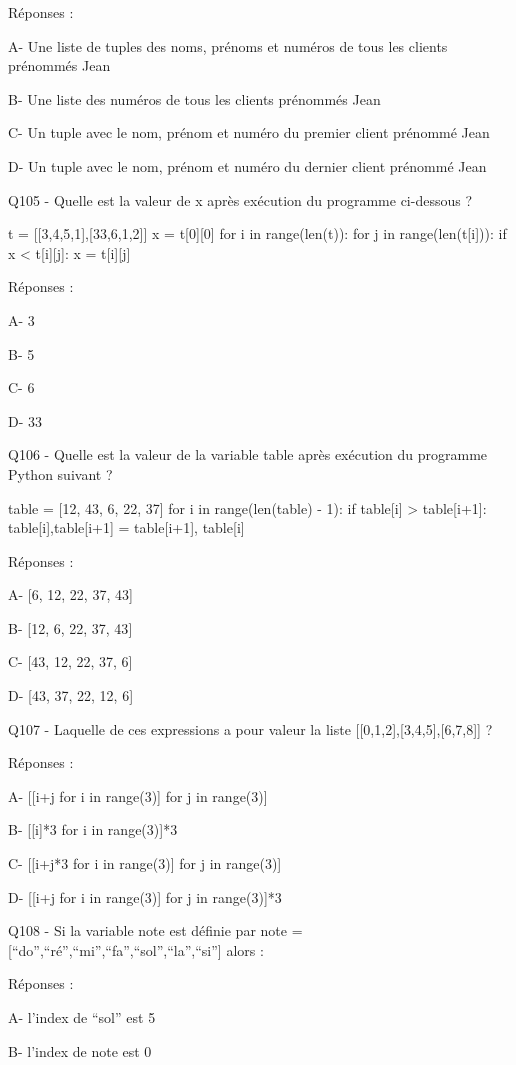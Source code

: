 \documentclass[
]{book}
\begin{document}
Réponses :

A- Une liste de tuples des noms, prénoms et numéros de tous les clients prénommés Jean

B- Une liste des numéros de tous les clients prénommés Jean

C- Un tuple avec le nom, prénom et numéro du premier client prénommé Jean

D- Un tuple avec le nom, prénom et numéro du dernier client prénommé Jean

Q105 - Quelle est la valeur de x après exécution du programme ci-dessous ?

t = {[}{[}3,4,5,1{]},{[}33,6,1,2{]}{]}
x = t{[}0{]}{[}0{]}
for i in range(len(t)):
for j in range(len(t{[}i{]})):
if x \textless{} t{[}i{]}{[}j{]}:
x = t{[}i{]}{[}j{]}

Réponses :

A- 3

B- 5

C- 6

D- 33

Q106 - Quelle est la valeur de la variable table après exécution du programme Python suivant ?

table = {[}12, 43, 6, 22, 37{]}
for i in range(len(table) - 1):
if table{[}i{]} \textgreater{} table{[}i+1{]}:
table{[}i{]},table{[}i+1{]} = table{[}i+1{]}, table{[}i{]}

Réponses :

A- {[}6, 12, 22, 37, 43{]}

B- {[}12, 6, 22, 37, 43{]}

C- {[}43, 12, 22, 37, 6{]}

D- {[}43, 37, 22, 12, 6{]}

Q107 - Laquelle de ces expressions a pour valeur la liste {[}{[}0,1,2{]},{[}3,4,5{]},{[}6,7,8{]}{]} ?

Réponses :

A- {[}{[}i+j for i in range(3){]} for j in range(3){]}

B- {[}{[}i{]}*3 for i in range(3){]}*3

C- {[}{[}i+j*3 for i in range(3){]} for j in range(3){]}

D- {[}{[}i+j for i in range(3){]} for j in range(3){]}*3

Q108 - Si la variable note est définie par note = {[}``do'',``ré'',``mi'',``fa'',``sol'',``la'',``si''{]} alors :

Réponses :

A- l'index de ``sol'' est 5

B- l'index de note est 0
\end{document}
